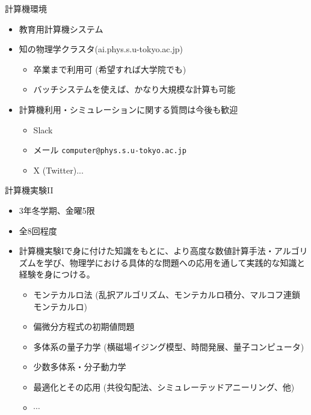 \documentclass[10pt,dvipdfmx]{beamer}
\begin{document}

\begin{frame}[t,fragile]{計算機環境}
  \begin{itemize}
  \item 教育用計算機システム
  \item 知の物理学クラスタ(ai.phys.s.u-tokyo.ac.jp)
    \begin{itemize}
    \item 卒業まで利用可 (希望すれば大学院でも)
    \item バッチシステムを使えば、かなり大規模な計算も可能
    \end{itemize}
  \item 計算機利用・シミュレーションに関する質問は今後も歓迎
    \begin{itemize}
      \item Slack
      \item メール {\tt computer@phys.s.u-tokyo.ac.jp}
      \item X (Twitter)...
    \end{itemize}
  \end{itemize}
\end{frame}

\begin{frame}[t,fragile]{計算機実験II}
  \begin{itemize}
  \item 3年冬学期、金曜5限
  \item 全8回程度
  \item 計算機実験Iで身に付けた知識をもとに、より高度な数値計算手法・アルゴリズムを学び、物理学における具体的な問題への応用を通して実践的な知識と経験を身につける。
    \begin{itemize}
      \item モンテカルロ法 (乱択アルゴリズム、モンテカルロ積分、マルコフ連鎖モンテカルロ)
      \item 偏微分方程式の初期値問題
      \item 多体系の量子力学 (横磁場イジング模型、時間発展、量子コンピュータ)
      \item 少数多体系・分子動力学
      \item 最適化とその応用 (共役勾配法、シミュレーテッドアニーリング、他)
      \item $\cdots$
    \end{itemize}
  \end{itemize}
\end{frame}
\end{document}
